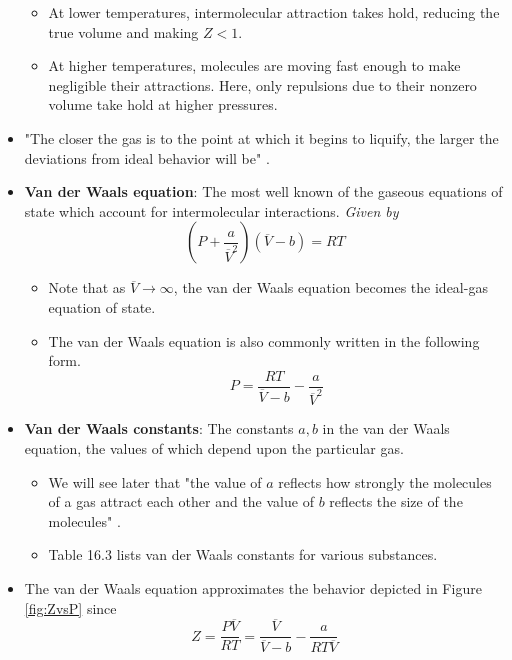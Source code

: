 \documentclass[../notes.tex]{subfiles}
\begin{document}
\begin{itemize}
\begin{itemize}
        \item At lower temperatures, intermolecular attraction takes hold, reducing the true volume and making $Z<1$.
        \item At higher temperatures, molecules are moving fast enough to make negligible their attractions. Here, only repulsions due to their nonzero volume take hold at higher pressures.
    \end{itemize}
    \item "The closer the gas is to the point at which it begins to liquify, the larger the deviations from ideal behavior will be" \parencite[642]{bib:McQuarrieSimon}.
    \item \textbf{Van der Waals equation}: The most well known of the gaseous equations of state which account for intermolecular interactions. \emph{Given by}
    \begin{equation*}
        \left( P+\frac{a}{\overline{V}^2} \right)(\overline{V}-b) = RT
    \end{equation*}
    \begin{itemize}
        \item Note that as $\overline{V}\to\infty$, the van der Waals equation becomes the ideal-gas equation of state.
        \item The van der Waals equation is also commonly written in the following form.
        \begin{equation*}
            P = \frac{RT}{\overline{V}-b}-\frac{a}{\overline{V}^2}
        \end{equation*}
    \end{itemize}
    \item \textbf{Van der Waals constants}: The constants $a,b$ in the van der Waals equation, the values of which depend upon the particular gas.
    \begin{itemize}
        \item We will see later that "the value of $a$ reflects how strongly the molecules of a gas attract each other and the value of $b$ reflects the size of the molecules" \parencite[643]{bib:McQuarrieSimon}.
        \item Table 16.3 lists van der Waals constants for various substances.
    \end{itemize}
    \item The van der Waals equation approximates the behavior depicted in Figure \ref{fig:ZvsP} since
    \begin{equation*}
        Z = \frac{P\overline{V}}{RT}
        = \frac{\overline{V}}{\overline{V}-b}-\frac{a}{RT\overline{V}}

\end{equation*}
\end{itemize}
\end{document}

